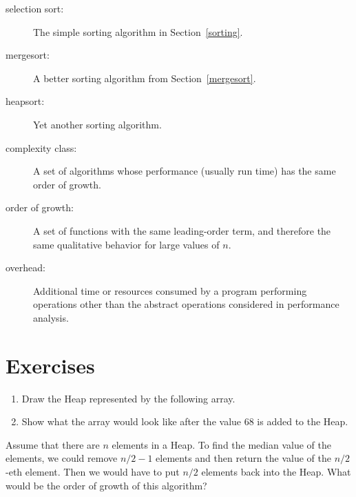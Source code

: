 \begin{description}

\item[selection sort:] The simple sorting algorithm in Section~\ref{sorting}.

\item[mergesort:]  A better sorting algorithm from Section~\ref{mergesort}.

\item[heapsort:]  Yet another sorting algorithm.

\item[complexity class:]  A set of algorithms whose performance
(usually run time) has the same order of growth.

\item[order of growth:]  A set of functions with the same leading-order
term, and therefore the same qualitative behavior for large values
of $n$.

\item[overhead:]  Additional time or resources consumed by a program
performing operations other than the abstract operations considered
in performance analysis.

\end{description}


\section{Exercises}

\begin{exercise}
\begin{enumerate}

\item Draw the Heap represented by the following array.


\item Show what the array would look like after the value
68 is added to the Heap.

\end{enumerate}
\end{exercise}

\begin{exercise}
Assume that there are $n$ elements in a Heap.  To find
the median value of the elements, we could remove $n/2-1$ elements
and then return the value of the $n/2$-eth element.  Then we
would have to put $n/2$ elements back into the Heap.  What would
be the order of growth of this algorithm?
\end{exercise}


